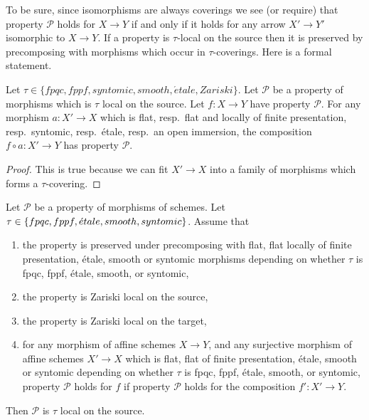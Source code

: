 \noindent
To be sure, since isomorphisms are always coverings
we see (or require) that property $\mathcal{P}$ holds for $X \to Y$
if and only if it holds for any arrow $X' \to Y'$ isomorphic to $X \to Y$.
If a property is $\tau$-local on the source then it is preserved by
precomposing with morphisms which occur in $\tau$-coverings. Here
is a formal statement.

\begin{lemma}
\label{lemma-precompose-property-local-source}
Let $\tau \in \{fpqc, fppf, syntomic, smooth, \acute{e}tale, Zariski\}$.
Let $\mathcal{P}$ be a property of morphisms which is $\tau$ local
on the source. Let $f : X \to Y$ have property $\mathcal{P}$.
For any morphism $a : X' \to X$ which is
flat, resp.\ flat and locally of finite presentation, resp.\ syntomic,
resp.\ \'etale, resp.\ an open immersion, the composition
$f \circ a : X' \to Y$ has property $\mathcal{P}$.
\end{lemma}

\begin{proof}
This is true because we can fit $X' \to X$ into a family of
morphisms which forms a $\tau$-covering.
\end{proof}

\begin{lemma}
\label{lemma-properties-morphisms-local-source}
Let $\mathcal{P}$ be a property of morphisms of schemes.
Let $\tau \in \{fpqc, \linebreak[0] fppf, \linebreak[0]
\acute{e}tale, \linebreak[0] smooth, \linebreak[0] syntomic\}$.
Assume that
\begin{enumerate}
\item the property is preserved under precomposing with
flat, flat locally of finite presentation, \'etale, smooth or syntomic morphisms
depending on whether $\tau$ is fpqc, fppf, \'etale, smooth, or syntomic,
\item the property is Zariski local on the source,
\item the property is Zariski local on the target,
\item for any morphism of affine schemes $X \to Y$, and
any surjective morphism of affine schemes $X' \to X$
which is flat, flat of finite presentation,
\'etale, smooth or syntomic depending on whether $\tau$ is
fpqc, fppf, \'etale, smooth, or syntomic, property
$\mathcal{P}$ holds for $f$ if property $\mathcal{P}$
holds for the composition $f' : X' \to Y$.
\end{enumerate}
Then $\mathcal{P}$ is $\tau$ local on the source.
\end{lemma}

